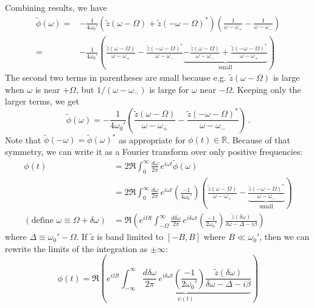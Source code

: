 \documentclass{article}
\begin{document}
Combining results, we have
\begin{align*}
  \tilde{\phi}(\omega)
  =& - \frac{1}{4 \omega_0'}
  \left( \tilde{z}(\omega - \Omega) + \tilde{z}(-\omega - \Omega)^* \right)
  \left(
    \frac{1}{\omega - \omega_+} - \frac{1}{\omega - \omega_-}
  \right) \\
  =& - \frac{1}{4 \omega_0'}
  \left(
      \frac{\tilde{z}(\omega - \Omega)}{\omega - \omega_+}
    - \frac{\tilde{z}(-\omega - \Omega)^*}{\omega - \omega_-}
    \underbrace{
      - \frac{\tilde{z}(\omega - \Omega)}{\omega - \omega_-}
      + \frac{\tilde{z}(-\omega - \Omega)^*}{\omega - \omega_+}
    }_\text{small}
  \right)
\end{align*}
The second two terms in parentheses are small because e.g. $\tilde{z}(\omega - \Omega)$ is large when $\omega$ is near $+\Omega$, but $1 / (\omega - \omega_-)$ is large for $\omega$ near $-\Omega$.
Keeping only the larger terms, we get
\begin{equation}
  \tilde{\phi}(\omega) =
  - \frac{1}{4 \omega_0'}
  \left(
      \frac{\tilde{z}(\omega - \Omega)}{\omega - \omega_+}
    - \frac{\tilde{z}(-\omega - \Omega)^*}{\omega - \omega_-}
  \right) \, .
\end{equation}
Note that $\tilde{\phi}(-\omega) = \tilde{\phi}(\omega)^*$ as appropriate for $\phi(t) \in \mathbb{R}$.
Because of that symmetry, we can write it as a Fourier transform over only positive frequencies:
\begin{align*}
  \phi(t)
  &= 2 \Re \int_0^\infty \frac{d\omega}{2\pi} \, e^{i \omega t} \tilde{\phi}(\omega) \\
  &= 2 \Re \int_0^\infty \frac{d\omega}{2\pi} \, e^{i \omega t} \left( \frac{-1}{4 \omega_0'} \right)
    \left(
      \frac{\tilde{z}(\omega - \Omega)}{\omega - \omega_+}
      - \underbrace{\frac{\tilde{z}(-\omega - \Omega)^*}{\omega - \omega_-}}_\text{small}
    \right) \\
  (\text{define } \omega \equiv \Omega + \delta \omega)
  &= \Re
  \left(
    e^{i \Omega t}
    \int_{-\Omega}^\infty \frac{d \delta \omega}{2\pi} \,
    e^{i \delta \omega t}
    \left( \frac{-1}{2 \omega_0'} \right)
    \frac{\tilde{z}(\delta \omega)}{\delta \omega - \Delta - i \beta}
  \right)
\end{align*}
where $\Delta \equiv \omega_0' - \Omega$.
If $\tilde{z}$ is band limited to $[-B, B]$ where $B \ll \omega_0'$, then we can rewrite the limits of the integration as $\pm \infty$:
\begin{equation}
  \phi(t) = \Re
  \left(
    e^{i \Omega t}
    \underbrace{
      \int_{-\infty}^\infty \frac{d \delta \omega}{2\pi} \,
      e^{i \delta \omega t}
      \left( \frac{-1}{2 \omega_0'} \right)
      \frac{\tilde{z}(\delta \omega)}{\delta \omega - \Delta - i \beta}
    }_{\psi(t)}
  \right)
\end{equation}
\end{document}
